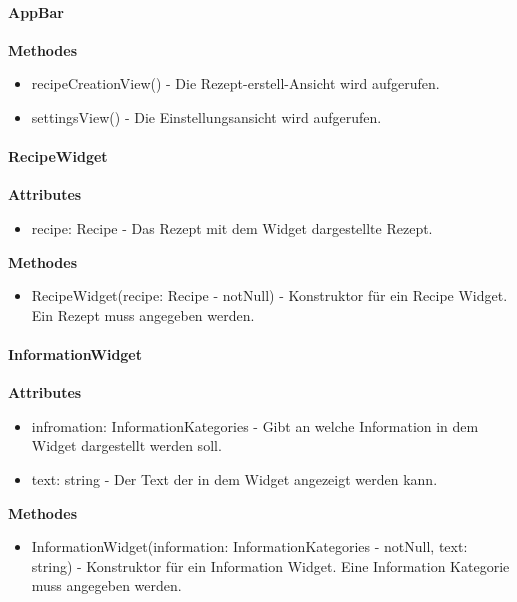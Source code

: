 \documentclass[parskip=full]{scrartcl}
\begin{document}
        \paragraph{AppBar}
            \textbf{Methodes}
                \begin{itemize}
                    \item recipeCreationView() - Die Rezept-erstell-Ansicht wird aufgerufen.
                    \item settingsView() - Die Einstellungsansicht wird aufgerufen.
                \end{itemize}

        \paragraph{RecipeWidget}
            \textbf{Attributes}
                 \begin{itemize}
                     \item recipe: Recipe - Das Rezept mit dem Widget dargestellte Rezept.
                 \end{itemize}
            \textbf{Methodes}
                \begin{itemize}
                    \item RecipeWidget(recipe: Recipe - notNull) - Konstruktor für ein Recipe Widget. Ein Rezept muss angegeben werden.
                \end{itemize}
                
        \paragraph{InformationWidget}
            \textbf{Attributes}
                \begin{itemize}
                    \item infromation: InformationKategories - Gibt an welche Information in dem Widget dargestellt werden soll.
                    \item text: string - Der Text der in dem Widget angezeigt werden kann.
                \end{itemize}

            \textbf{Methodes}
                \begin{itemize}
                    \item InformationWidget(information: InformationKategories - notNull, text: string) - Konstruktor für ein Information Widget. Eine Information Kategorie muss angegeben werden.
                \end{itemize}
\end{document}
